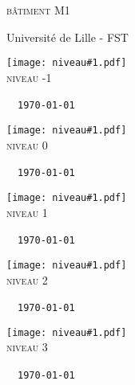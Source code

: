 \documentclass{article}
\newcommand{\niveau}[1]{
\clearpage
\begin{center}
  \texttt{[image: niveau\#1.pdf]}\\
  {\Huge \textsc{niveau #1}}
\end{center}
\vfill
\tiny~~\texttt{\today}\hfill\usebox{\github}
}
\begin{document}
\begin{center}
\vspace*{\fill}
{\Huge \textsc{bâtiment M1}}

\vspace{1cm}
{\Large Université de Lille - FST}
\vspace*{\fill}
\end{center}

\niveau{-1}
\niveau{0}
\niveau{1}
\niveau{2}
\niveau{3}~
\end{document}
